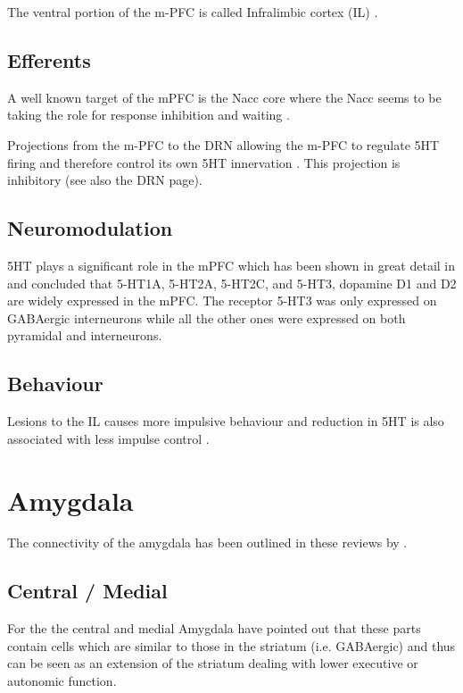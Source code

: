 \documentclass[12pt,a4paper]{article}
\begin{document}
The ventral portion of the m-PFC is called Infralimbic cortex (IL)
\citep{Tsutsui-Kimura2016}.

\subsection{Efferents}
A well known target of the mPFC is the Nacc core where the Nacc seems
to be taking the role for response inhibition and waiting
\citep{Neufang2016, Feja2014}.

Projections from the m-PFC to the DRN allowing the m-PFC to regulate
5HT firing and therefore control its own 5HT innervation
\citep{Homberg2012, Juckel1999}. This projection is inhibitory
(see also the DRN page).

\subsection{Neuromodulation}
5HT plays a significant role in the mPFC which has been shown in great
detail in \citep{Santana2017} and concluded that 5-HT1A, 5-HT2A,
5-HT2C, and 5-HT3, dopamine D1 and D2 are widely expressed in the
mPFC. The receptor 5-HT3 was only expressed on GABAergic interneurons
while all the other ones were expressed on both pyramidal and
interneurons.


\subsection{Behaviour}
Lesions to the IL causes more impulsive behaviour
\citep{Tsutsui-Kimura2016} and reduction in 5HT is also associated
with less impulse control \citep{Neufang2016}.









\section{Amygdala}
The connectivity of the amygdala has been outlined in these reviews by
\citet{Alheid2003, Sah2003, Swanson1998}.

\subsection{Central / Medial}
For the the central and medial Amygdala
\citep{Swanson2003, Swanson1998} have pointed out that these
parts contain cells which are similar to those in the striatum
(i.e. GABAergic) and thus can be seen as an extension of the striatum
dealing with lower executive or autonomic function.
\end{document}
